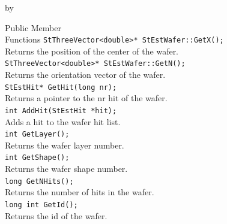 \documentclass[twoside]{article}
\newcommand{\entrylabel}[1]{\mbox{\textbf{{#1}}}\hfil}%
\newenvironment{entry}
{\begin{list}{}%
    {\renewcommand{\makelabel}{\entrylabel}%
     \setlength{\labelwidth}{90pt}%
     \setlength{\leftmargin}{\labelwidth}
     \advance\leftmargin by \labelsep%
      }%
    }%
  {\end{list}}
\newcommand{\Entrylabel}[1]%
{\raisebox{0pt}[1ex][0pt]{\makebox[\labelwidth][l]%
    {\parbox[t]{\labelwidth}{\hspace{0pt}\textbf{{#1}}}}}}
\newenvironment{Entry}%
{\renewcommand{\entrylabel}{\Entrylabel}\begin{entry}}%
  {\end{entry}}
\begin{document}
\begin{Entry}
\item[Public Member\\ Functions]
	\verb+StThreeVector<double>* StEstWafer::GetX();+\\
	Returns the position of the center of the wafer.\\ 
	\verb+StThreeVector<double>* StEstWafer::GetN();+\\
	Returns the orientation vector of the wafer.\\
	\verb+StEstHit* GetHit(long nr);+\\
	Returns a pointer to the nr hit of the wafer.\\
	\verb+int AddHit(StEstHit *hit);+\\
	Adds a hit to the wafer hit list.\\
	\verb+int GetLayer();+\\
	Returns the wafer layer number.\\
	\verb+int GetShape();+\\
	Returns the wafer shape number.\\
	\verb+long GetNHits();+\\
	Returns the number of hits in the wafer.\\
	\verb+long int GetId();+\\
	Returns the id of the wafer.\\	
\end{Entry}

%
%
\end{document}
